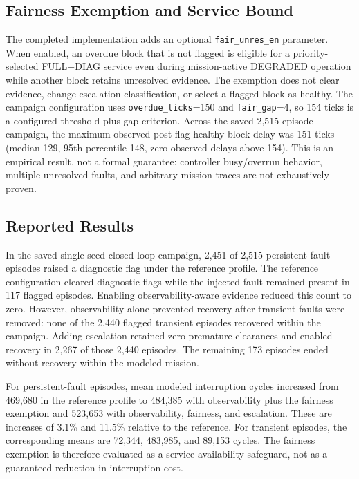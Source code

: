 \documentclass[journal]{IEEEtran}
\begin{document}
\subsection{Fairness Exemption and Service Bound}
The completed implementation adds an optional \texttt{fair\_unres\_en} parameter. When enabled, an overdue block that is not flagged is eligible for a priority-selected FULL+DIAG service even during mission-active DEGRADED operation while another block retains unresolved evidence. The exemption does not clear evidence, change escalation classification, or select a flagged block as healthy. The campaign configuration uses \texttt{overdue\_ticks}=150 and \texttt{fair\_gap}=4, so 154 ticks is a configured threshold-plus-gap criterion. Across the saved 2,515-episode campaign, the maximum observed post-flag healthy-block delay was 151 ticks (median 129, 95th percentile 148, zero observed delays above 154). This is an empirical result, not a formal guarantee: controller busy/overrun behavior, multiple unresolved faults, and arbitrary mission traces are not exhaustively proven.

\subsection{Reported Results}
In the saved single-seed closed-loop campaign, 2,451 of 2,515 persistent-fault episodes raised a diagnostic flag under the reference profile. The reference configuration cleared diagnostic flags while the injected fault remained present in 117 flagged episodes. Enabling observability-aware evidence reduced this count to zero. However, observability alone prevented recovery after transient faults were removed: none of the 2,440 flagged transient episodes recovered within the campaign. Adding escalation retained zero premature clearances and enabled recovery in 2,267 of those 2,440 episodes. The remaining 173 episodes ended without recovery within the modeled mission.

For persistent-fault episodes, mean modeled interruption cycles increased from 469,680 in the reference profile to 484,385 with observability plus the fairness exemption and 523,653 with observability, fairness, and escalation. These are increases of 3.1\% and 11.5\% relative to the reference. For transient episodes, the corresponding means are 72,344, 483,985, and 89,153 cycles. The fairness exemption is therefore evaluated as a service-availability safeguard, not as a guaranteed reduction in interruption cost.
\end{document}
